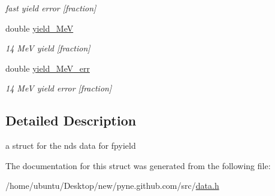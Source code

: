 \begin{DoxyCompactItemize}
\begin{DoxyCompactList}\small\item\em fast yield error \mbox{[}fraction\mbox{]} \end{DoxyCompactList}\item 
double \hyperlink{structpyne_1_1ndsfpysub_afb3737be03fedddc6f54fa3a0e59f0e8}{yield\+\_\+MeV}\hypertarget{structpyne_1_1ndsfpysub_afb3737be03fedddc6f54fa3a0e59f0e8}{}\label{structpyne_1_1ndsfpysub_afb3737be03fedddc6f54fa3a0e59f0e8}

\begin{DoxyCompactList}\small\item\em 14 MeV yield \mbox{[}fraction\mbox{]} \end{DoxyCompactList}\item 
double \hyperlink{structpyne_1_1ndsfpysub_a7bc2487245689a3f6a095f2254e66e99}{yield\+\_\+Me\+V\+\_\+err}\hypertarget{structpyne_1_1ndsfpysub_a7bc2487245689a3f6a095f2254e66e99}{}\label{structpyne_1_1ndsfpysub_a7bc2487245689a3f6a095f2254e66e99}

\begin{DoxyCompactList}\small\item\em 14 MeV yield error \mbox{[}fraction\mbox{]} \end{DoxyCompactList}\end{DoxyCompactItemize}


\subsection{Detailed Description}
a struct for the nds data for fpyield 

The documentation for this struct was generated from the following file\+:\begin{DoxyCompactItemize}
\item 
/home/ubuntu/\+Desktop/new/pyne.\+github.\+com/src/\hyperlink{data_8h}{data.\+h}\end{DoxyCompactItemize}
